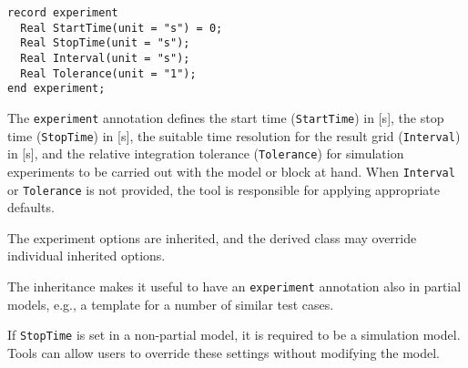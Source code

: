 \begin{annotationdefinition}[experiment]

\begin{synopsis}
\begin{lstlisting}[language=modelica]
record experiment
  Real StartTime(unit = "s") = 0;
  Real StopTime(unit = "s");
  Real Interval(unit = "s");
  Real Tolerance(unit = "1");
end experiment;
\end{lstlisting}
\end{synopsis}
\begin{semantics}
The \lstinline!experiment! annotation defines the start time (\lstinline!StartTime!) in {[}s{]}, the stop time (\lstinline!StopTime!) in {[}s{]}, the suitable time resolution for the result grid (\lstinline!Interval!) in {[}s{]}, and the relative integration tolerance (\lstinline!Tolerance!) for simulation experiments to be carried out with the model or block at hand.
When \lstinline!Interval! or \lstinline!Tolerance! is not provided, the tool is responsible for applying appropriate defaults.

The experiment options are inherited, and the derived class may override individual inherited options.
\begin{nonnormative}
The inheritance makes it useful to have an \lstinline!experiment! annotation also in partial models, e.g., a template for a number of similar test cases.
\end{nonnormative}

If \lstinline!StopTime! is set in a non-partial model, it is required to be a simulation model.
Tools can allow users to override these settings without modifying the model.
\end{semantics}
\end{annotationdefinition}

